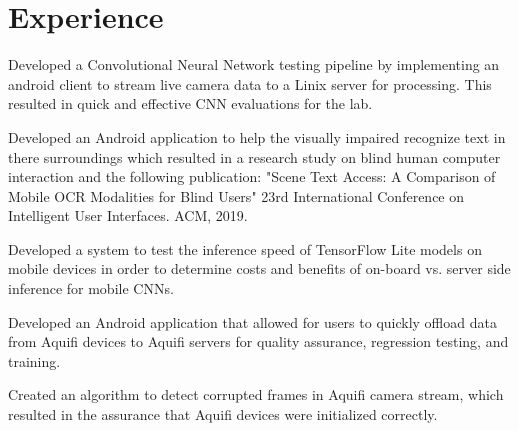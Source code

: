 \documentclass[letterpaper]{deedy-resume} %
\begin{document}
\hfill
%
%
\begin{minipage}[t]{0.66\textwidth} %


\section{Experience}


\vspace{\topsep} %
\begin{tightitemize}
	\item Developed a Convolutional Neural Network testing pipeline by implementing an android client to stream  live camera data to a Linix server for processing. This resulted in quick and effective CNN evaluations for the lab. 
	\item Developed an Android application to help the visually impaired recognize text in there surroundings which resulted in a research study on blind human computer interaction and the following publication: "Scene Text Access: A Comparison of Mobile OCR Modalities for Blind Users" 23rd International Conference on Intelligent User Interfaces. ACM, 2019.
	\item Developed a system to test the inference speed of TensorFlow Lite models on mobile devices in order to determine costs and benefits of on-board vs. server side inference for mobile CNNs.
\end{tightitemize}
\sectionspace %


\begin{tightitemize}
	\item Developed an Android application that allowed for users to quickly offload data from Aquifi devices to Aquifi servers for quality assurance, regression testing, and training.
	\item Created an algorithm to detect corrupted frames in Aquifi camera stream, which resulted in the assurance that Aquifi devices were initialized correctly.
\end{tightitemize}


\end{minipage}
\end{document}
